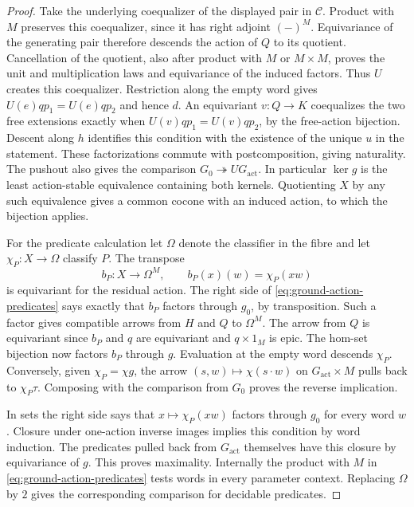 \documentclass[11pt,a4paper]{article}
\theoremstyle{definition}
\theoremstyle{remark}\newaliascnt{remark}{theorem}
\numberwithin{equation}{section}
\begin{document}
\begin{proof}
Take the underlying coequalizer of the displayed pair in $\mathcal C$. Product with $M$ preserves this coequalizer, since it has right adjoint $(-)^M$. Equivariance of the generating pair therefore descends the action of $Q$ to its quotient. Cancellation of the quotient, also after product with $M$ or $M\times M$, proves the unit and multiplication laws and equivariance of the induced factors. Thus $U$ creates this coequalizer. Restriction along the empty word gives $U(e)qp_1=U(e)qp_2$ and hence $d$. An equivariant $v:Q\to K$ coequalizes the two free extensions exactly when $U(v)qp_1=U(v)qp_2$, by the free-action bijection. Descent along $h$ identifies this condition with the existence of the unique $u$ in the statement. These factorizations commute with postcomposition, giving naturality. The pushout also gives the comparison $G_0\twoheadrightarrow UG_{\mathrm{act}}$. In particular $\ker g$ is the least action-stable equivalence containing both kernels. Quotienting $X$ by any such equivalence gives a common cocone with an induced action, to which the bijection applies.

For the predicate calculation let $\Omega$ denote the classifier in the fibre and let $\chi_P:X\to\Omega$ classify $P$. The transpose
\[
 b_P:X\longrightarrow\Omega^M,\qquad b_P(x)(w)=\chi_P(xw)
\]
is equivariant for the residual action. The right side of \eqref{eq:ground-action-predicates} says exactly that $b_P$ factors through $g_0$, by transposition. Such a factor gives compatible arrows from $H$ and $Q$ to $\Omega^M$. The arrow from $Q$ is equivariant since $b_P$ and $q$ are equivariant and $q\times1_M$ is epic. The hom-set bijection now factors $b_P$ through $g$. Evaluation at the empty word descends $\chi_P$. Conversely, given $\chi_P=\chi g$, the arrow $(s,w)\mapsto\chi(s\cdot w)$ on $G_{\mathrm{act}}\times M$ pulls back to $\chi_P\tau$. Composing with the comparison from $G_0$ proves the reverse implication.

In sets the right side says that $x\mapsto\chi_P(xw)$ factors through $g_0$ for every word $w$. Closure under one-action inverse images implies this condition by word induction. The predicates pulled back from $G_{\mathrm{act}}$ themselves have this closure by equivariance of $g$. This proves maximality. Internally the product with $M$ in \eqref{eq:ground-action-predicates} tests words in every parameter context. Replacing $\Omega$ by $2$ gives the corresponding comparison for decidable predicates.
\end{proof}
\end{document}
